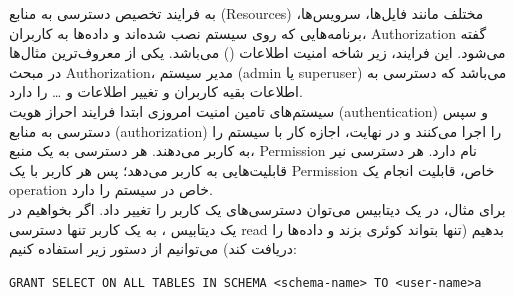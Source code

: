 \documentclass[]{article}
\begin{document}
به فرایند تخصیص دسترسی به منابع (Resources) مختلف مانند فایل‌ها، سرویس‌ها، برنامه‌هایی که روی سیستم نصب شده‌اند و داده‌ها به کاربران، Authorization گفته می‌شود. این فرایند، زیر شاخه امنیت اطلاعات () می‌باشد. یکی از معروف‌ترین مثال‌ها در مبحث Authorization، مدیر سیستم (admin یا superuser) می‌باشد که دسترسی به اطلاعات بقیه کاربران و تغییر اطلاعات و … را دارد.\\
سیستم‌های تامین امنیت امروزی ابتدا فرایند احراز هویت (authentication) و سپس دسترسی به منابع (authorization) را اجرا می‌کنند و در نهایت، اجازه کار با سیستم را به کاربر می‌دهند.
هر دسترسی به یک منبع، Permission نام دارد. هر دسترسی نیر قابلیت‌هایی به کاربر می‌دهد؛ پس هر کاربر با یک Permission خاص، قابلیت انجام یک operation خاص در سیستم را دارد.\\
برای مثال، در یک دیتابیس می‌توان دسترسی‌های یک کاربر را تغییر داد. اگر بخواهیم در یک دیتابیس ، به یک کاربر تنها دسترسی read بدهیم (تنها بتواند کوئری بزند و داده‌ها را دریافت کند) می‌توانیم از دستور زیر استفاده کنیم:
    \LTR
	\begin{latin}
\begin{lstlisting}
GRANT SELECT ON ALL TABLES IN SCHEMA <schema-name> TO <user-name>a
\end{lstlisting}
	\end{latin}
	\RTL
\end{document}
